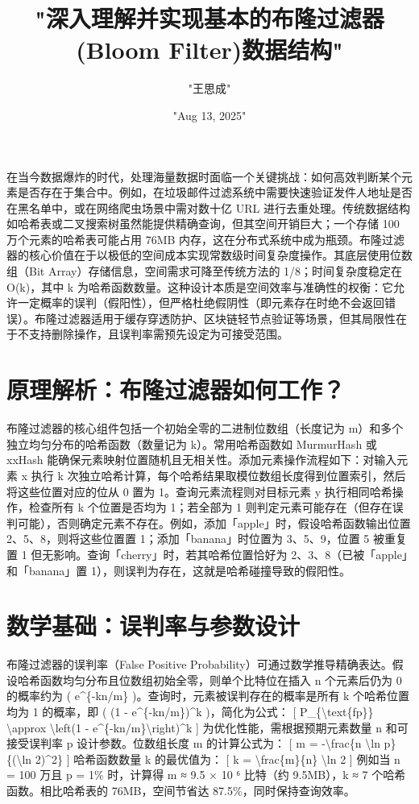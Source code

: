 \title{"深入理解并实现基本的布隆过滤器(Bloom Filter)数据结构"}
\author{"王思成"}
\date{"Aug 13, 2025"}
\maketitle
在当今数据爆炸的时代，处理海量数据时面临一个关键挑战：如何高效判断某个元素是否存在于集合中。例如，在垃圾邮件过滤系统中需要快速验证发件人地址是否在黑名单中，或在网络爬虫场景中需对数十亿 URL 进行去重处理。传统数据结构如哈希表或二叉搜索树虽然能提供精确查询，但其空间开销巨大；一个存储 100 万个元素的哈希表可能占用 76MB 内存，这在分布式系统中成为瓶颈。布隆过滤器的核心价值在于以极低的空间成本实现常数级时间复杂度操作。其底层使用位数组（Bit Array）存储信息，空间需求可降至传统方法的 1/8；时间复杂度稳定在 O(k)，其中 k 为哈希函数数量。这种设计本质是空间效率与准确性的权衡：它允许一定概率的误判（假阳性），但严格杜绝假阴性（即元素存在时绝不会返回错误）。布隆过滤器适用于缓存穿透防护、区块链轻节点验证等场景，但其局限性在于不支持删除操作，且误判率需预先设定为可接受范围。\par
\chapter{原理解析：布隆过滤器如何工作？}
布隆过滤器的核心组件包括一个初始全零的二进制位数组（长度记为 m）和多个独立均匀分布的哈希函数（数量记为 k）。常用哈希函数如 MurmurHash 或 xxHash 能确保元素映射位置随机且无相关性。添加元素操作流程如下：对输入元素 x 执行 k 次独立哈希计算，每个哈希结果取模位数组长度得到位置索引，然后将这些位置对应的位从 0 置为 1。查询元素流程则对目标元素 y 执行相同哈希操作，检查所有 k 个位置是否均为 1；若全部为 1 则判定元素可能存在（但存在误判可能），否则确定元素不存在。例如，添加「apple」时，假设哈希函数输出位置 2、5、8，则将这些位置置 1；添加「banana」时位置为 3、5、9，位置 5 被重复置 1 但无影响。查询「cherry」时，若其哈希位置恰好为 2、3、8（已被「apple」和「banana」置 1），则误判为存在，这就是哈希碰撞导致的假阳性。\par
\chapter{数学基础：误判率与参数设计}
布隆过滤器的误判率（False Positive Probability）可通过数学推导精确表达。假设哈希函数均匀分布且位数组初始全零，则单个比特位在插入 n 个元素后仍为 0 的概率约为 ( e\^{}\{{}-kn/m\}{} )。查询时，元素被误判存在的概率是所有 k 个哈希位置均为 1 的概率，即 ( (1 - e\^{}\{{}-kn/m\}{})\^{}k )，简化为公式：
[ P\_{}\{{}\textbackslash{}text\{{}fp\}{}\}{} \textbackslash{}approx \textbackslash{}left(1 - e\^{}\{{}-kn/m\}{}\textbackslash{}right)\^{}k ]
为优化性能，需根据预期元素数量 n 和可接受误判率 p 设计参数。位数组长度 m 的计算公式为：
[ m = -\textbackslash{}frac\{{}n \textbackslash{}ln p\}{}\{{}(\textbackslash{}ln 2)\^{}2\}{} ]
哈希函数数量 k 的最优值为：
[ k = \textbackslash{}frac\{{}m\}{}\{{}n\}{} \textbackslash{}ln 2 ]
例如当 n = 100 万且 p = 1\%{} 时，计算得 m ≈ 9.5 × 10 ⁶ 比特（约 9.5MB），k ≈ 7 个哈希函数。相比哈希表的 76MB，空间节省达 87.5\%{}，同时保持查询效率。\par
